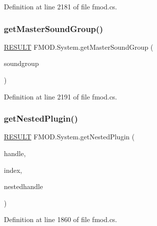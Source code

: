 Definition at line 2181 of file fmod.\+cs.

\mbox{\label{class_f_m_o_d_1_1_system_af789867ecd0d9c452b70648bf46f15ee}} 
\subsubsection{\texorpdfstring{get\+Master\+Sound\+Group()}{getMasterSoundGroup()}}
{\footnotesize\ttfamily \hyperlink{namespace_f_m_o_d_a305d1176ef3f8c8815861a60407ac33d}{R\+E\+S\+U\+LT} F\+M\+O\+D.\+System.\+get\+Master\+Sound\+Group (\begin{DoxyParamCaption}\item[{out \hyperlink{class_f_m_o_d_1_1_sound_group}{Sound\+Group}}]{soundgroup }\end{DoxyParamCaption})}



Definition at line 2191 of file fmod.\+cs.

\mbox{\label{class_f_m_o_d_1_1_system_a96ab9f2453605260d95099282512405a}} 
\subsubsection{\texorpdfstring{get\+Nested\+Plugin()}{getNestedPlugin()}}
{\footnotesize\ttfamily \hyperlink{namespace_f_m_o_d_a305d1176ef3f8c8815861a60407ac33d}{R\+E\+S\+U\+LT} F\+M\+O\+D.\+System.\+get\+Nested\+Plugin (\begin{DoxyParamCaption}\item[{uint}]{handle,  }\item[{int}]{index,  }\item[{out uint}]{nestedhandle }\end{DoxyParamCaption})}



Definition at line 1860 of file fmod.\+cs.

\mbox{\label{class_f_m_o_d_1_1_system_a6a4082919f21874283d8df6280032798}} 
